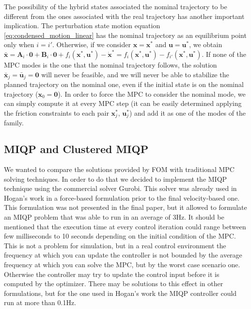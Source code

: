 \documentclass[12,twoside]{TFG-GM}
\theoremstyle{definition}
\theoremstyle{remark}
\newcommand*\diff[1]{\bar{#1}}
\begin{document}
The possibility of the hybrid states associated the nominal trajectory to be different from the ones associated with the real trajectory has another important implication. The perturbation state motion equation \ref{eq:condensed_motion_linear} has the nominal trajectory as an equilibrium point only when $i = i'$. Otherwise, if we consider $\textbf{x} = \textbf{x}^*$ and $\textbf{u} = \textbf{u}^*$, we obtain $\diff{\textbf{x}} = \textbf{A}_i \cdot \textbf{0} + \textbf{B}_i \cdot \textbf{0} + f_i(\textbf{x}^*, \textbf{u}^*) - \dot{\textbf{x}}^* = f_i(\textbf{x}^*, \textbf{u}^*) - f_{i'}(\textbf{x}^*, \textbf{u}^*)$. If none of the MPC modes is the one that the nominal trajectory follows, the solution $\diff{\textbf{x}}_j = \diff{\textbf{u}}_j = \textbf{0}$ will never be feasible, and we will never be able to stabilize the planned trajectory on the nominal one, even if the initial state is on the nominal trajectory ($\textbf{x}_0 = \textbf{0}$). In order to force the MPC to consider the nominal mode, we can simply compute it at every MPC step (it can be easily determined applying the friction constraints to each pair $\textbf{x}_j^*$, $\textbf{u}_j^*$) and add it as one of the modes of the family.

\subsection{MIQP and Clustered MIQP}
\label{subsec:miqp}

We wanted to compare the solutions provided by FOM with traditional MPC solving techniques. In order to do that we decided to implement the MIQP technique using the commercial solver Gurobi. This solver was already used in Hogan's work in a force-based formulation prior to the final velocity-based one. This formulation was not presented in the final paper, but it allowed to formulate an MIQP problem that was able to run in an average of 3Hz. It should be mentioned that the execution time at every control iteration could range between few milliseconds to 10 seconds depending on the initial condition of the MPC.
This is not a problem for simulation, but in a real control environment the frequency at which you can update the controller is not bounded by the average frequency at which you can solve the MPC, but by the worst case scenario one. Otherwise the controller may try to update the control input before it is computed by the optimizer. There may be solutions to this effect in other formulations, but for the one used in Hogan's work the MIQP controller could run at more than 0.1Hz.
\end{document}
